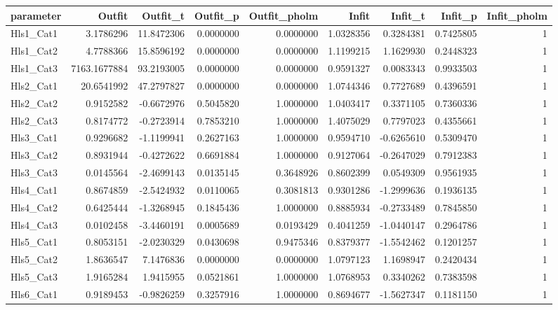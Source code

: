 \documentclass[
]{book}
\begin{document}
\begin{tabular}{l|r|r|r|r|r|r|r|r}
\hline
parameter & Outfit & Outfit\_t & Outfit\_p & Outfit\_pholm & Infit & Infit\_t & Infit\_p & Infit\_pholm\\
\hline
Hls1\_Cat1 & 3.1786296 & 11.8472306 & 0.0000000 & 0.0000000 & 1.0328356 & 0.3284381 & 0.7425805 & 1\\
\hline
Hls1\_Cat2 & 4.7788366 & 15.8596192 & 0.0000000 & 0.0000000 & 1.1199215 & 1.1629930 & 0.2448323 & 1\\
\hline
Hls1\_Cat3 & 7163.1677884 & 93.2193005 & 0.0000000 & 0.0000000 & 0.9591327 & 0.0083343 & 0.9933503 & 1\\
\hline
Hls2\_Cat1 & 20.6541992 & 47.2797827 & 0.0000000 & 0.0000000 & 1.0744346 & 0.7727689 & 0.4396591 & 1\\
\hline
Hls2\_Cat2 & 0.9152582 & -0.6672976 & 0.5045820 & 1.0000000 & 1.0403417 & 0.3371105 & 0.7360336 & 1\\
\hline
Hls2\_Cat3 & 0.8174772 & -0.2723914 & 0.7853210 & 1.0000000 & 1.4075029 & 0.7797023 & 0.4355661 & 1\\
\hline
Hls3\_Cat1 & 0.9296682 & -1.1199941 & 0.2627163 & 1.0000000 & 0.9594710 & -0.6265610 & 0.5309470 & 1\\
\hline
Hls3\_Cat2 & 0.8931944 & -0.4272622 & 0.6691884 & 1.0000000 & 0.9127064 & -0.2647029 & 0.7912383 & 1\\
\hline
Hls3\_Cat3 & 0.0145564 & -2.4699143 & 0.0135145 & 0.3648926 & 0.8602399 & 0.0549309 & 0.9561935 & 1\\
\hline
Hls4\_Cat1 & 0.8674859 & -2.5424932 & 0.0110065 & 0.3081813 & 0.9301286 & -1.2999636 & 0.1936135 & 1\\
\hline
Hls4\_Cat2 & 0.6425444 & -1.3268945 & 0.1845436 & 1.0000000 & 0.8885934 & -0.2733489 & 0.7845850 & 1\\
\hline
Hls4\_Cat3 & 0.0102458 & -3.4460191 & 0.0005689 & 0.0193429 & 0.4041259 & -1.0440147 & 0.2964786 & 1\\
\hline
Hls5\_Cat1 & 0.8053151 & -2.0230329 & 0.0430698 & 0.9475346 & 0.8379377 & -1.5542462 & 0.1201257 & 1\\
\hline
Hls5\_Cat2 & 1.8636547 & 7.1476836 & 0.0000000 & 0.0000000 & 1.0797123 & 1.1698947 & 0.2420434 & 1\\
\hline
Hls5\_Cat3 & 1.9165284 & 1.9415955 & 0.0521861 & 1.0000000 & 1.0768953 & 0.3340262 & 0.7383598 & 1\\
\hline
Hls6\_Cat1 & 0.9189453 & -0.9826259 & 0.3257916 & 1.0000000 & 0.8694677 & -1.5627347 & 0.1181150 & 1\\

\end{tabular}
\end{document}

